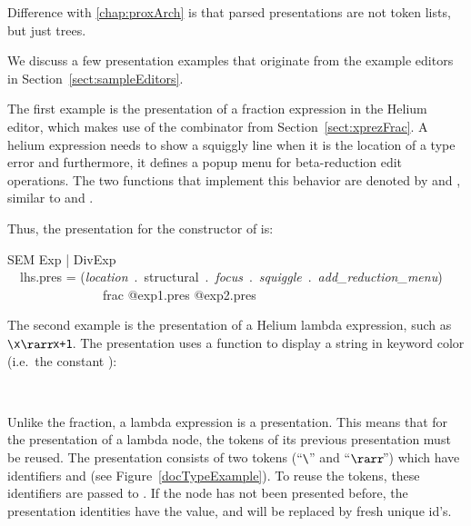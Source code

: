 \toHere
Difference with \ref{chap:proxArch} is that parsed presentations are not token lists, but just trees.
\fromHere


We discuss a few presentation examples that originate from the example editors in Section~\ref{sect:sampleEditors}.


The first example is the presentation of a fraction expression in the Helium editor, which makes use of the  combinator from Section~\ref{sect:xprezFrac}. A helium expression needs to show a squiggly line when it is the location of a type error and furthermore, it defines a popup menu for beta-reduction edit operations. The two functions that implement this behavior are denoted by  and , similar to  and . 

Thus, the presentation for the  constructor of  is:

\ttfamily\begin{small}\begin{tabbing}
SEM Exp | DivExp\\
~~lhs.pres = ({\em location}~.~structural~.~{\em focus}~.~{\em squiggle}~.~{\em add\_reduction\_menu})\\
~~~~~~~~~~~~~~~frac @exp1.pres @exp2.pres
\end{tabbing}\end{small}\rmfamily


The second example is the presentation of a Helium lambda expression, such as \verb|\x|$\rarr\!$\verb|x+1|. The presentation uses a function  to display a string in keyword color (i.e.\ the constant ): 

\begin{small}
\\
\end{small}

Unlike the fraction, a lambda expression is a  presentation. This means that for the presentation of a lambda node, the tokens of its previous presentation must be reused. The presentation consists of two tokens (``\verb|\|'' and ``$\rarr\!$'') which have identifiers  and  (see Figure~\ref{docTypeExample}). To reuse the tokens, these identifiers are passed to . If the node has not been presented before, the presentation identities have the  value, and will be replaced by fresh unique id's. 

